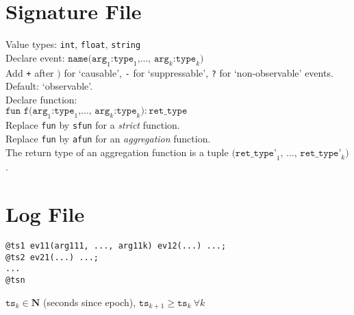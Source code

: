 \documentclass[a4paper,9pt]{extarticle}
\begin{document}
\begin{multicols}{2}
\section{Signature File}
\begin{tcolorbox}
  Value types: \texttt{int}, \texttt{float}, \texttt{string}\\[5pt]
  Declare event: $\texttt{name(arg}_1\texttt{:type}_1\texttt{,..., arg}_k\texttt{:type}_k\texttt{)}$\\[5pt]
  Add \texttt{+} after $\texttt{)}$ for `causable', \texttt{-} for `suppressable', \texttt{?}
  for `non-observable' events. Default: `observable'.\\[5pt]
  Declare function:\\ $\texttt{fun~f(arg}_1\texttt{:type}_1\texttt{,..., arg}_k\texttt{:type}_k\texttt{)} : \texttt{ret\_type}$\\[5pt]
  Replace \texttt{fun} by \texttt{sfun} for a \emph{strict} function.\\[5pt]
  Replace \texttt{fun} by \texttt{afun} for an \emph{aggregation} function.\\[5pt]
  The return type of an aggregation function is a tuple $\texttt{(ret\_type'}_1\texttt{, ..., ret\_type'}_k\texttt{)}$.
\end{tcolorbox}

\section{Log File}
\begin{tcolorbox}
\begin{verbatim}
@ts1 ev11(arg111, ..., arg11k) ev12(...) ...;
@ts2 ev21(...) ...;
...
@tsn
\end{verbatim}
  $\texttt{ts}_k \in \mathbf{N}$ (seconds since epoch), $\texttt{ts}_{k+1} \geq \texttt{ts}_{k}~\forall k$
\end{tcolorbox}


\end{multicols}
\end{document}
